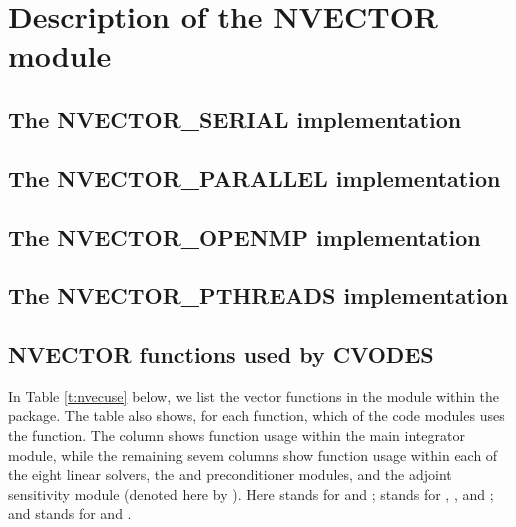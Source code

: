 \chapter{Description of the NVECTOR module}\label{s:nvector}


\section{The NVECTOR\_SERIAL implementation}\label{ss:nvec_ser}


\section{The NVECTOR\_PARALLEL implementation}\label{ss:nvec_par}


\section{The NVECTOR\_OPENMP implementation}\label{ss:nvec_openmp}


\section{The NVECTOR\_PTHREADS implementation}\label{ss:nvec_pthreads}


\section{NVECTOR functions used by CVODES}

In Table \ref{t:nvecuse} below, we list the vector functions in the 
{\nvector} module within the {\cvodes} package.
The table also shows, for each function, which of the code modules uses
the function. The {\cvodes} column shows function usage within the main
integrator module, while the remaining sevem columns show function usage
within each of the eight {\cvodes} linear solvers, the {\cvbandpre} and
{\cvbbdpre} preconditioner modules, and the {\cvodes} adjoint sensitivity
module (denoted here by {\cvodea}).  Here {\cvdls} stands for {\cvdense} and
{\cvband}; {\cvspils} stands for {\cvspgmr}, {\cvspbcg}, and {\cvsptfqmr};
and {\cvsls} stands for {\cvklu} and {\cvsuperlumt}.

